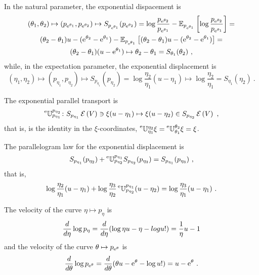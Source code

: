 \documentclass[12pt,a4paper]{amsart}
\begin{document}
In the natural parameter, the exponential dispacement is
\begin{multline}
  \label{eq:6}
  (\theta_1,\theta_2) \mapsto \left(p_{\mathrm{e}^{\theta_1}},p_{\mathrm{e}^{\theta_2}}\right) \mapsto S_{p_{\mathrm{e}^{\theta_1}}}(p_{\mathrm{e}^{\theta_2}}) = \log \frac {p_{\mathrm{e}^{\theta_2}}}{p_{\mathrm{e}^{\theta_1}}} - \operatorname{\mathbb E}_{p_{\mathrm{e}^{\theta_1}}}\left[\log \frac {p_{\mathrm{e}^{\theta_2}}}{p_{\mathrm{e}^{\theta_1}}}\right] = \\ (\theta_2 - \theta_1) u - (\mathrm{e}^{\theta_2} - \mathrm{e}^{\theta_1}) - \operatorname{\mathbb E}_{p_{\mathrm{e}^{\theta_1}}}\left[(\theta_2 - \theta_1) u - (\mathrm{e}^{\theta_2} - \mathrm{e}^{\theta_1})\right] = \\  (\theta_2-\theta_1) (u - \mathrm{e}^{\theta_1}) \mapsto \theta_2 - \theta_1 = S_{\theta_1}(\theta_2) \ ,
\end{multline}
while, in the expectation parameter, the exponential displacement is
\begin{equation}
  \label{eq:9}
  (\eta_1,\eta_2) \mapsto (p_{\eta_1},p_{\eta_2}) \mapsto S_{p_{\eta_1}}(p_{\eta_2}) = \log \frac {\eta_2}{\eta_1} (u - \eta_1) \mapsto \log \frac {\eta_2}{\eta_1} = S_{\eta_1}(\eta_2) \ .
\end{equation}

The exponential parallel transport is
\begin{equation}
  \label{eq:10}
  \prescript{\text{e}}{} {\mathbb U} _ {p_{\eta_1}} ^ {p_{\eta_2}} \colon S_{p_{\eta_1}}\operatorname{\mathcal E}\left(V\right) \ni \xi(u - \eta_1) \mapsto \xi(u - \eta_2) \in S_{p_{\eta_2}}\operatorname{\mathcal E}\left(V\right) \ ,
\end{equation}
that is, is the identity in the $\xi$-coordinates, $\prescript{\text{e}}{} {\mathbb U} _ {\eta_1} ^ {\eta_2} \xi = \prescript{\text{e}}{} {\mathbb U} _ {\theta_1} ^ {\theta_2} \xi = \xi$.

The parallelogram law for the exponential displacement is 
\begin{equation}
  \label{eq:11}
  S_{p_{\eta_1}}(p_{\eta_2}) + \prescript{\text{e}}{} {\mathbb U} _ {p_{\eta_2}} ^ {p_{\eta_1}} S_{p_{\eta_2}}(p_{\eta_3}) = S_{p_{\eta_1}}(p_{\eta_3}) \ ,
\end{equation}
that is,
\begin{equation}
  \label{eq:12}
  \log \frac {\eta_2}{\eta_1}(u - \eta_1) + \log \frac {\eta_3}{\eta_2} \prescript{\text{e}}{} {\mathbb U} _ {p_{\eta_2}} ^ {p_{\eta_1}} (u - \eta_2) = \log \frac {\eta_3}{\eta_1}  (u - \eta_1) \ . 
\end{equation}

The velocity of the curve $\eta \mapsto p_\eta$ is
\begin{equation}
  \label{eq:13}
  \frac{d}{d\eta} \log p_\eta = \frac{d}{d\eta} (\log \eta u - \eta - log u!) = \frac 1 \eta u - 1  
\end{equation}
and the velocity of the curve $\theta \mapsto p_{\mathrm{e}^\theta}$ is 
\begin{equation}
  \label{eq:14}
  \frac{d}{d\theta} \log p_{\mathrm{e}^\theta} = \frac{d}{d\theta} (\theta u - \mathrm{e}^\theta - \log u!) = u - \mathrm{e}^\theta \ . 
\end{equation}
\end{document}
